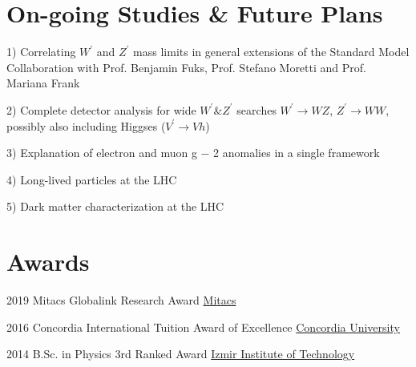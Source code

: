 \documentclass[]{friggeri-cv}
\begin{document}
\section{On-going Studies \& Future Plans}

\begin{entrylist}
	
	\entrySuperLong
{1)}
{Correlating $W^\prime$ and $Z^\prime$ mass limits in general extensions of the Standard Model}
{Collaboration with Prof. Benjamin Fuks, Prof. Stefano Moretti and Prof. Mariana Frank}
{\href{https://www.mitacs.ca/en/programs/globalink/globalink-research-award}{}} 

	\entrySuperLong
{2)}
{Complete detector analysis for wide $W^\prime \& Z^\prime$ searches}
{$W^\prime \to WZ$, $Z^\prime \to WW$, possibly also including Higgses ($V^\prime \to V h$)}
{\href{https://www.mitacs.ca/en/programs/globalink/globalink-research-award}{}} 
	
	\entrySuperLong
{3)}
{Explanation of electron and muon g − 2 anomalies in a single framework}
{}
{\href{https://www.mitacs.ca/en/programs/globalink/globalink-research-award}{}} 	
	
	
	\entrySuperLong
{4)}
{Long-lived particles at the LHC}
{}
{\href{https://www.mitacs.ca/en/programs/globalink/globalink-research-award}{}} 	
	
	\entrySuperLong
{5)}
{Dark matter characterization at the LHC}
{}
{\href{https://www.mitacs.ca/en/programs/globalink/globalink-research-award}{}} 		
	
	
\end{entrylist}	




\section{Awards}

\begin{entrylist}
	
\entryp
{2019}
{Mitacs Globalink Research Award}
{\href{https://www.mitacs.ca/en/programs/globalink/globalink-research-award}{Mitacs}} 	
	

\entryp
{2016}
{Concordia International Tuition Award of Excellence}
{\href{http://www.concordia.ca}{Concordia University}} 	


\entryp
{2014}
{B.Sc. in Physics 3rd Ranked Award}
{\href{http://www.iyte.edu.tr/AnaSayfa.aspx?d=ENG}{Izmir Institute of Technology}} 	
	
	
\end{entrylist}	
\end{document}
